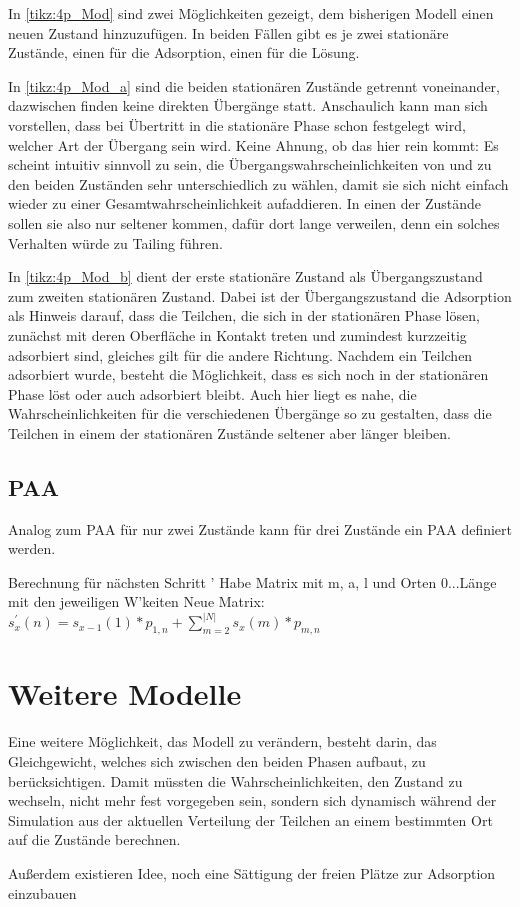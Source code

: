 In \ref{tikz:4p_Mod} sind zwei Möglichkeiten gezeigt, dem bisherigen Modell einen neuen Zustand hinzuzufügen.
In beiden Fällen gibt es je zwei stationäre Zustände, einen für die Adsorption, einen für die Lösung. 

In \ref{tikz:4p_Mod_a} sind die beiden stationären Zustände getrennt voneinander, dazwischen finden keine direkten Übergänge statt. 
Anschaulich kann man sich vorstellen, dass bei Übertritt in die stationäre Phase schon festgelegt wird, welcher Art der Übergang sein wird.
Keine Ahnung, ob das hier rein kommt: Es scheint intuitiv sinnvoll zu sein, die Übergangswahrscheinlichkeiten von und zu den beiden Zuständen sehr unterschiedlich zu wählen, damit sie sich nicht einfach wieder zu einer Gesamtwahrscheinlichkeit aufaddieren. In einen der Zustände sollen sie also nur seltener kommen, dafür dort lange verweilen, denn ein solches Verhalten würde zu Tailing führen.

In \ref{tikz:4p_Mod_b} dient der erste stationäre Zustand als Übergangszustand zum zweiten stationären Zustand. Dabei ist der Übergangszustand die Adsorption als Hinweis darauf, dass die Teilchen, die sich in der stationären Phase lösen, zunächst mit deren Oberfläche in Kontakt treten und zumindest kurzzeitig adsorbiert sind, gleiches gilt für die andere Richtung. Nachdem ein Teilchen adsorbiert wurde, besteht die Möglichkeit, dass es sich noch in der stationären Phase löst oder auch adsorbiert bleibt. Auch hier liegt es nahe, die Wahrscheinlichkeiten für die verschiedenen Übergänge so zu gestalten, dass die Teilchen in einem der stationären Zustände seltener aber länger bleiben.
 

\subsection{PAA}

Analog zum PAA für nur zwei Zustände kann für drei Zustände ein PAA definiert werden. 


Berechnung für nächsten Schritt '
Habe Matrix mit m, a, l und Orten 0...Länge mit den jeweiligen W'keiten
Neue Matrix:
$s^{'}_x(n) = s_{x-1}(1) * p_{1,n} + \sum^{|N|}_{m=2}{s_x(m) * p_{m,n}}$


\section{Weitere Modelle}

Eine weitere Möglichkeit, das Modell zu verändern, besteht darin, das Gleichgewicht, welches sich zwischen den beiden Phasen aufbaut, zu berücksichtigen. Damit müssten die Wahrscheinlichkeiten, den Zustand zu wechseln, nicht mehr fest vorgegeben sein, sondern sich dynamisch während der Simulation aus der aktuellen Verteilung der Teilchen an einem bestimmten Ort auf die Zustände berechnen.

Außerdem existieren Idee, noch eine Sättigung der freien Plätze zur Adsorption einzubauen


